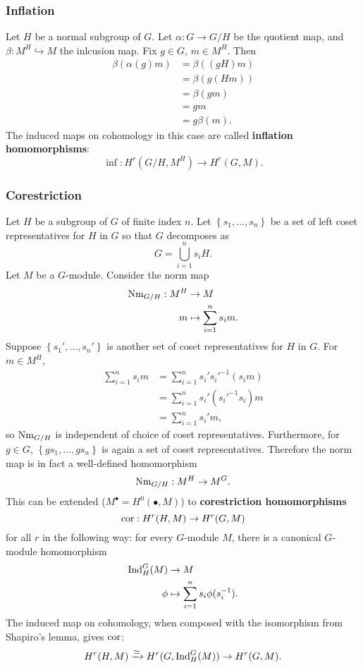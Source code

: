 \subsubsection{Inflation}
Let $H$ be a normal subgroup of $G$. Let $\alpha:G\to G/H$ be the quotient map, and $\beta:M^{H}\hookrightarrow M$ the inlcusion map. Fix $g\in G$, $m\in M^{H}$. Then 
\begin{align*}
	\beta(\alpha(g)m)&=\beta((gH)m)\\
			 &=\beta(g(Hm))\\
			 &=\beta(gm)\\
			 &=gm\\
			 &=g\beta(m)
.\end{align*}
The induced maps on cohomology in this case are called \textbf{inflation homomorphisms}:
\[
	\inf:H^{r}(G/H,M^{H})\to H^{r}(G,M)
.\] 
\subsubsection{Corestriction}
Let $H$ be a subgroup of $G$ of finite index $n$. Let $\left\lbrace s_1,\dots, s_n\right\rbrace$ be a set of left coset representatives for $H$ in $G$ so that $G$ decomposes as
\[
	G=\bigcup\limits_{i=1}^{n}s_iH
.\] 
Let $M$ be a $G$-module. Consider the norm map  
\begin{align*}
	\mathrm{Nm}_{G/H}:M^{H}&\to M\\
	m&\mapsto\sum\limits_{i=1}^{n}s_im
.\end{align*}
Suppose $\left\lbrace s_1',\dots, s_n'\right\rbrace$ is another set of coset representatives for $H$ in $G$. For $m\in M^{H}$,
\begin{align*}
	\sum\limits_{i=1}^{n}s_im&=\sum\limits_{i=1}^{n}s_i's_i'^{-1}(s_im)\\
				 &=\sum\limits_{i=1}^{n}s_i'(s_i'^{-1}s_i)m\\
				 &=\sum\limits_{i=1}^{n}s_i'm
,\end{align*}
so $\mathrm{Nm}_{G/H}$ is independent of choice of coset representatives. Furthermore, for $g\in G$, $\left\lbrace gs_1,\dots, gs_n\right\rbrace$ is again a set of coset representatives. Therefore the norm map is in fact a well-defined homomorphism
\begin{align*}
	\mathrm{Nm}_{G/H}:M^{H}\to M^{G}
.\end{align*}
This can be extended ($M^{\bullet}=H^{0}(\bullet,M)$) to \textbf{corestriction homomorphisms}
\[
	\operatorname{cor}:H^{r}(H,M)\to H^{r}(G,M)
\] 
for all $r$ in the following way: for every $G$-module $M$, there is a canonical $G$-module homomorphism
\begin{align*}
	\operatorname{Ind}^{G}_H(M)&\to M\\
	\phi&\mapsto\sum\limits_{i=1}^{n}s_i\phi(s_i^{-1})
.\end{align*}
The induced map on cohomology, when composed with the isomorphism from Shapiro's lemma, gives $\operatorname{cor}$:
\[
	H^{r}(H,M)\xrightarrow{\simeq}H^{r}(G,\operatorname{Ind}^{G}_H(M))\to H^{r}(G,M)
.\] 
